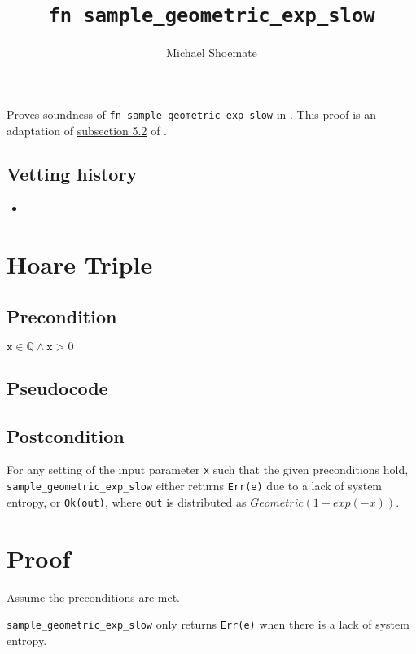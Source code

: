 \documentclass{article}
\title{\texttt{fn sample\_geometric\_exp\_slow}}
\author{Michael Shoemate}
\begin{document}
\maketitle

\contrib
Proves soundness of \texttt{fn sample\_geometric\_exp\_slow} in .
This proof is an adaptation of \href{https://arxiv.org/pdf/2004.00010.pdf#subsection.5.2}{subsection 5.2} of \cite{CKS20}.

\subsection*{Vetting history}
\begin{itemize}
    \item {}
\end{itemize}

\section{Hoare Triple}
\subsection*{Precondition}
$\texttt{x} \in \mathbb{Q} \land \texttt{x} > 0$

\subsection*{Pseudocode}        


\subsection*{Postcondition}\label{postcondition}
For any setting of the input parameter \texttt{x} such that the given preconditions hold, \\
\texttt{sample\_geometric\_exp\_slow} either returns \texttt{Err(e)} due to a lack of system entropy,
or \texttt{Ok(out)}, where \texttt{out} is distributed as $Geometric(1 - exp(-x))$.

\section{Proof}
Assume the preconditions are met.

\begin{lemma}\label{err-e}
    \texttt{sample\_geometric\_exp\_slow} only returns \texttt{Err(e)} when there is a lack of system entropy.
\end{lemma}
\end{document}
